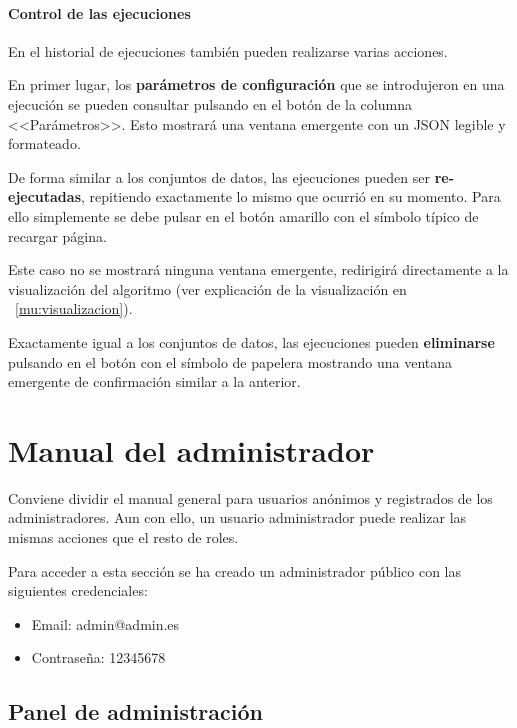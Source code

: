 \paragraph{Control de las ejecuciones} En el historial de ejecuciones también
pueden realizarse varias acciones.

\label{mu:parametrosrun}
En primer lugar, los \textbf{parámetros de configuración} que se introdujeron en
una ejecución se pueden consultar pulsando en el botón de la columna
<<Parámetros>>. Esto mostrará una ventana emergente con un JSON legible y
formateado.


De forma similar a los conjuntos de datos, las ejecuciones pueden ser
\textbf{re-ejecutadas}, repitiendo exactamente lo mismo que ocurrió en su
momento. Para ello simplemente se debe pulsar en el botón amarillo con el
símbolo típico de recargar página.

Este caso no se mostrará ninguna ventana emergente, redirigirá directamente a la
visualización del algoritmo (ver explicación de la visualización en
~\ref{mu:visualizacion}).

\label{mu:eliminarrun}
Exactamente igual a los conjuntos de datos, las ejecuciones pueden
\textbf{eliminarse} pulsando en el botón con el símbolo de papelera mostrando
una ventana emergente de confirmación similar a la anterior.



\section{Manual del administrador}

Conviene dividir el manual general para usuarios anónimos y registrados de los
administradores. Aun con ello, un usuario administrador puede realizar las
mismas acciones que el resto de roles.

Para acceder a esta sección se ha creado un administrador público con las
siguientes credenciales:
\begin{itemize}
    \item Email: admin@admin.es
    \item Contraseña: 12345678
\end{itemize}

\subsection{Panel de administración}

